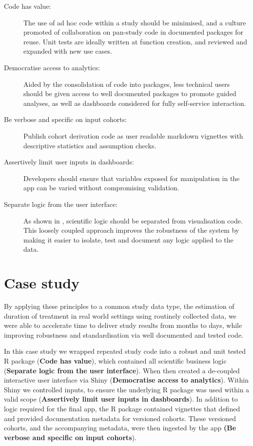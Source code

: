 \documentclass{amia}
\begin{document}
\begin{description}
  \item[Code has value:] The use of ad hoc code within a study should be minimised, and a culture promoted of collaboration on pan-study code in documented packages for reuse. Unit tests are ideally written at function creation, and reviewed and expanded with new use cases.
  \item[Democratise access to analytics:] Aided by the consolidation of code into packages, less technical users should be given access to well documented packages to promote guided analyses, as well as dashboards considered for fully self-service interaction.
  \item[Be verbose and specific on input cohorts:] Publish cohort derivation code as user readable markdown vignettes with descriptive statistics and assumption checks.
  \item[Assertively limit user inputs in dashboards:] Developers should ensure that variables exposed for manipulation in the app can be varied without compromising validation.
  \item[Separate logic from the user interface:] As shown in , scientific logic should be separated from visualisation code. This loosely coupled approach improves the robustness of the system by making it easier to isolate, test and document any logic applied to the data.
\end{description}

\section*{Case study}

By applying these principles to a common study data type, the estimation of duration of treatment in real world settings using routinely collected data, we were able to accelerate time to deliver study results from months to days, while improving robustness and standardisation via well documented and tested code.

In this case study we wrapped repeated study code into a robust and unit tested R package (\textbf{Code has value}), which contained all scientific business logic (\textbf{Separate logic from the user interface}).  When then created a de-coupled interactive user interface via Shiny (\textbf{Democratise access to analytics}). Within Shiny we controlled inputs, to ensure the underlying R package was used within a valid scope (\textbf{Assertively limit user inputs in dashboards}). In addition to logic required for the final app, the R package contained vignettes that defined and provided documentation metadata for versioned cohorts. These versioned cohorts, and the accompanying metadata, were then ingested by the app \textbf{(Be verbose and specific on input cohorts}).
\end{document}
